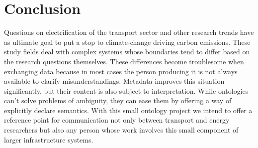 ﻿\section{Conclusion}
\label{conclusion}

Questions on electrification of the transport sector and other research trends
have as ultimate goal to put a stop to climate-change driving carbon emissions.
These study fields deal with complex systems whose boundaries tend to differ
based on the research questions themselves. These differences become
troublesome when exchanging data because in most cases the person producing it
is not always available to clarify misunderstandings. Metadata improves this
situation significantly, but their content is also subject to interpretation.
While ontologies can't solve problems of ambiguity, they can ease them by
offering a way of explicitly declare semantics. With this small ontology
project we intend to offer a reference point for communication not only between
transport and energy researchers but also any person whose work involves this
small component of larger infrastructure systems.